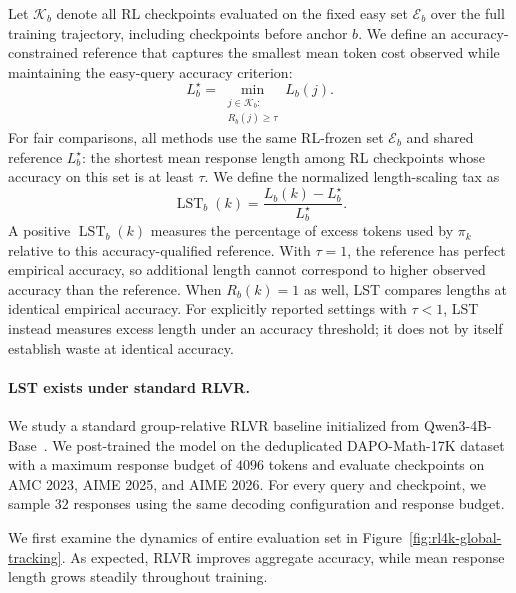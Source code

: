 \documentclass{article} %
\begin{document}
Let $\mathcal{K}_b$ denote all RL checkpoints evaluated on the fixed easy set
$\mathcal{E}_b$ over the full training trajectory, including checkpoints before
anchor $b$. We define an accuracy-constrained reference that captures the
smallest mean token cost observed while maintaining the easy-query accuracy criterion:
\begin{equation}
  L_b^\star
  =
  \min_{\substack{j\in\mathcal{K}_b:\\
  R_b(j)\ge \tau}}
  L_b(j).
  \label{eq:matched-reference}
\end{equation}
For fair comparisons, all methods use the same RL-frozen set $\mathcal{E}_b$
and shared reference $L_b^\star$: the shortest mean response length among
RL checkpoints whose accuracy on this set is at least $\tau$.
We define the normalized length-scaling tax as
\begin{equation}
  \operatorname{LST}_b(k)
  =
  \frac{L_b(k)-L_b^\star}{L_b^\star}.
  \label{eq:lst}
\end{equation}
A positive $\operatorname{LST}_b(k)$ measures the percentage of excess tokens
used by $\pi_k$ relative to this accuracy-qualified reference.
With $\tau=1$, the reference has perfect empirical accuracy, so additional
length cannot correspond to higher observed accuracy than the reference.
When $R_b(k)=1$ as well, LST compares lengths at identical empirical accuracy.
For explicitly reported settings with $\tau<1$, LST instead measures excess
length under an accuracy threshold; it does not by itself establish waste
at identical accuracy.


\paragraph{LST exists under standard RLVR.} We study a standard group-relative RLVR baseline initialized from Qwen3-4B-Base~\citep{yang2025qwen3}. We post-trained the model on the deduplicated DAPO-Math-17K dataset~\cite{yu2026dapo} with a maximum response budget of $4096$ tokens and evaluate checkpoints on AMC 2023, AIME 2025, and AIME 2026. For every query
and checkpoint, we sample $32$ responses using the same decoding
configuration and response budget. 

We first examine the dynamics of entire evaluation set in Figure~\ref{fig:rl4k-global-tracking}. As expected, RLVR improves aggregate
accuracy, while mean response length grows steadily throughout training.
\end{document}
